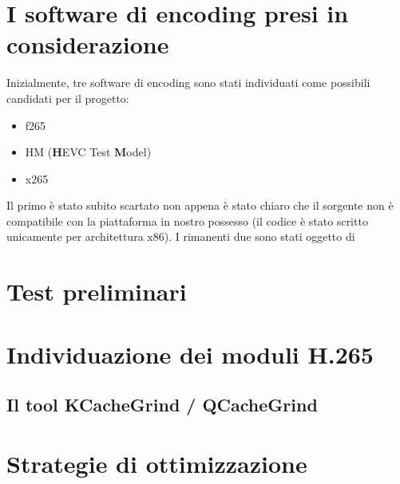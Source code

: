 \section{I software di encoding presi in considerazione}
Inizialmente, tre software di encoding sono stati individuati come possibili
candidati per il progetto:
\begin{itemize}
\item f265
\item HM (\textbf{H}EVC Test \textbf{M}odel)
\item x265
\end{itemize}
Il primo è stato subito scartato non appena è stato chiaro che il sorgente non 
è compatibile con la piattaforma in nostro possesso (il codice è stato scritto 
unicamente per architettura x86).
I rimanenti due sono stati oggetto di 

\section{Test preliminari}


\section{Individuazione dei moduli H.265}


\subsection{Il tool KCacheGrind / QCacheGrind}


\section{Strategie di ottimizzazione}

